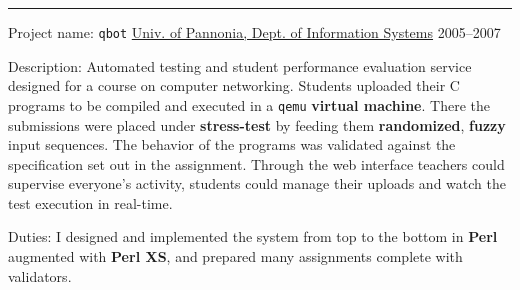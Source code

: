 \documentclass[a4paper,12pt]{article}
\newcommand\Yell{\textbf}
\newcommand\Label{\textsf}
\newcommand{\midline}{\rule[0.5ex]{\linewidth-\parindent}{.5pt}}
\begin{document}
\midline\par
\Label{Project name}: \texttt{qbot}\hfill
\href{http://virt.uni-pannon.hu/index.php/about-the-department}%
{Univ. of Pannonia, Dept. of Information Systems}
\Label{2005--2007}\par\medskip
\Label{Description}: Automated testing and student performance evaluation
service designed for a course on computer networking.  Students uploaded
their C programs to be compiled and executed in a \texttt{qemu} \Yell{virtual
machine}.  There the submissions were placed under \Yell{stress-test} by
feeding them \Yell{randomized}, \Yell{fuzzy} input sequences.  The behavior
of the programs was validated against the specification set out in the
assignment.  Through the web interface teachers could supervise everyone's
activity, students could manage their uploads and watch the test execution
in real-time.
\par\medskip
\Label{Duties}: I designed and implemented the system from top to the bottom
in \Yell{Perl} augmented with \Yell{Perl XS}, and prepared many assignments
complete with validators.
\end{document}
